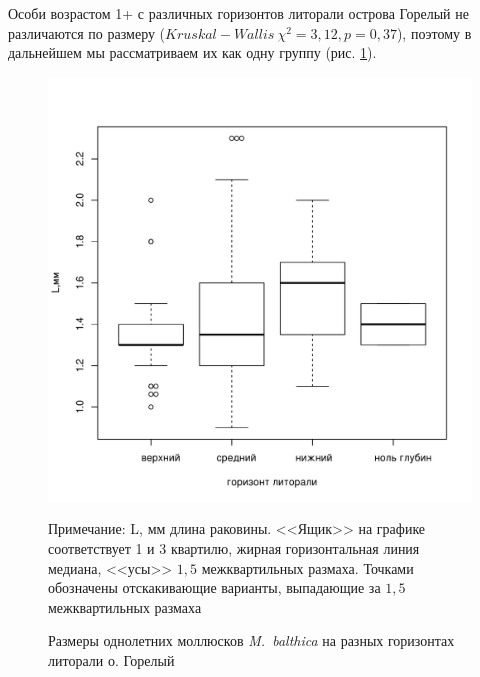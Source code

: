 Особи возрастом 1+ с различных горизонтов литорали острова Горелый не различаются по размеру ($Kruskal-Wallis\ \chi^2 = 3,12, p = 0,37$), поэтому в дальнейшем мы рассматриваем их как одну группу (рис. \ref{ris:Goreliy_length1+_gorizonty}).
	\begin{figure}[p]
		\includegraphics{../White_Sea/growth_young/boxplot_Goreliy_length_1+_tidal.pdf}
	\caption{Размеры  однолетних моллюсков {\it M.~balthica} на разных горизонтах литорали о. Горелый}
	\label{ris:Goreliy_length1+_gorizonty}
	{\footnotesize Примечание: L, мм \textemdash длина раковины. <<Ящик>> на графике соответствует 1 и 3 квартилю, жирная горизонтальная линия \textemdash 		медиана, <<усы>> \textemdash $1,5$ межквартильных размаха. Точками обозначены отскакивающие варианты, выпадающие за $1,5$ межквартильных размаха}
	\end{figure}

